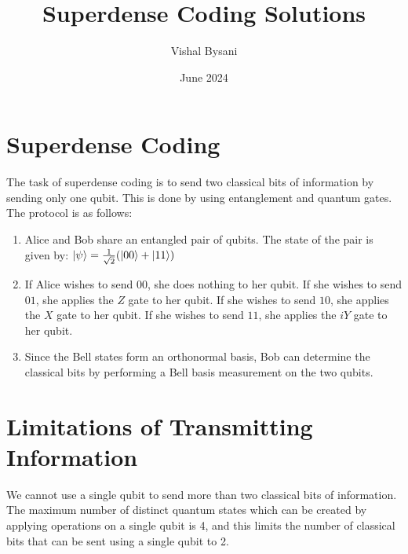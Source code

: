 \documentclass{article}
\title{Superdense Coding  Solutions}
\author{Vishal Bysani}
\date{June 2024}
\DeclarePairedDelimiter\ket{\lvert}{\rangle}
\begin{document}
\maketitle
\section{Superdense Coding}
The task of superdense coding is to send two classical bits of information by sending only one qubit. This is done by using entanglement and quantum gates. The protocol is as follows:
\begin{enumerate}
    \item Alice and Bob share an entangled pair of qubits. The state of the pair is given by: $\ket{\psi} = \frac{1}{\sqrt{2}}(\ket{00} + \ket{11})$
    \item If Alice wishes to send $00$, she does nothing to her qubit. If she wishes to send $01$, she applies the $Z$ gate to her qubit. If she wishes to send $10$, she applies the $X$ gate to her qubit. If she wishes to send $11$, she applies the $iY$ gate to her qubit.
    \item Since the Bell states form an orthonormal basis, Bob can determine the classical bits by performing a Bell basis measurement on the two qubits.
\end{enumerate}

\section{ Limitations of Transmitting Information}
We cannot use a single qubit to send more than two classical bits of information. The maximum number of distinct quantum states which can be created by applying operations on a single qubit is 4, and this limits the number of classical bits that can be sent using a single qubit to 2.

\end{document}
